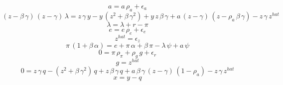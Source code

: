 \documentclass[10pt,a4paper]{article}
\begin{document}
\footnotesize
\begin{dmath}
a=a\, {\rho_a}+{\epsilon_a}
\end{dmath}
\begin{dmath}
\left({z}-{\beta}\, {\gamma}\right)\, \left({z}-{\gamma}\right)\, \lambda={z}\, {\gamma}\, y-y\, \left({z}^{2}+{\beta}\, {\gamma}^{2}\right)+y\, {z}\, {\beta}\, {\gamma}+a\, \left({z}-{\gamma}\right)\, \left({z}-{\rho_a}\, {\beta}\, {\gamma}\right)-{z}\, {\gamma}\, z^{hat}
\end{dmath}
\begin{dmath}
\lambda=\lambda+r-\pi
\end{dmath}
\begin{dmath}
e=e\, {\rho_e}+{\epsilon_e}
\end{dmath}
\begin{dmath}
z^{hat}={\epsilon_z}
\end{dmath}
\begin{dmath}
\pi\, \left(1+{\beta}\, {\alpha}\right)=e+\pi\, {\alpha}+{\beta}\, \pi-\lambda\, {\psi}+a\, {\psi}
\end{dmath}
\begin{dmath}
0=\pi\, {\rho_\pi}+{\rho_g}\, g+{\epsilon_r}
\end{dmath}
\begin{dmath}
g=z^{hat}
\end{dmath}
\begin{dmath}
0={z}\, {\gamma}\, q-\left({z}^{2}+{\beta}\, {\gamma}^{2}\right)\, q+{z}\, {\beta}\, {\gamma}\, q+a\, {\beta}\, {\gamma}\, \left({z}-{\gamma}\right)\, \left(1-{\rho_a}\right)-{z}\, {\gamma}\, z^{hat}
\end{dmath}
\begin{dmath}
x=y-q
\end{dmath}
\end{document}
